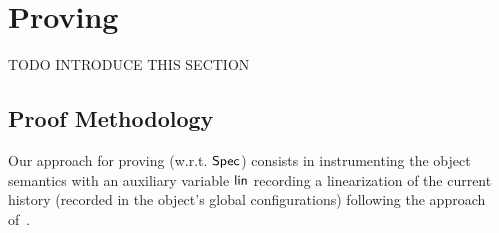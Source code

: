 \section{Proving \CRDTLin{}}


TODO INTRODUCE THIS SECTION

\subsection{Proof Methodology}\label{ssec:proof-methodology}

Our approach for proving \CRDTLin{} (w.r.t. $\mathsf{Spec}{}$) consists in
instrumenting the object semantics with an auxiliary variable
$\mathsf{lin}$ recording a linearization of the current history (recorded
in the object's global configurations) following the approach
of~\cite{VafeiadisHHS06,more citations}.


